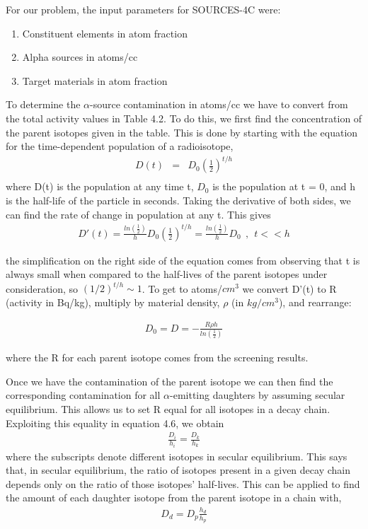 \documentclass{report}
\begin{document}
For our problem, the input parameters for SOURCES-4C were:
\begin{enumerate}
\item Constituent elements in atom fraction
\item Alpha sources in atoms/cc
\item Target materials in atom fraction
\end{enumerate}

To determine the $\alpha$-source contamination in atoms/cc we have to convert
from the total activity values in Table 4.2. To do this, we first find the concentration of the parent isotopes given in the table. This is done by starting with the equation for the time-dependent population of a radioisotope,
\begin{eqnarray}
D(t) & =& D_0\left(\frac{1}{2}\right)^{t/h} \\
\end{eqnarray}
where D(t) is the population at any time t, $D_0$ is the population at t = 0, and h is the half-life of the particle in seconds. Taking the derivative of both sides, we can find the rate of change in population at any t. This gives
\begin{eqnarray}
D'(t) = \frac{ln\left(\frac{1}{2}\right)}{h}D_0\left(\frac{1}{2}\right)^{t/h} = \frac{ln\left(\frac{1}{2}\right)}{h}D_0 \ \ , \ \ t << h
\end{eqnarray}

the simplification on the right side of the equation comes from observing that t is always small when compared to the half-lives of the parent isotopes under consideration, so $(1/2)^{t/h} \sim 1$. To get to atoms/$cm^3$ we convert D'(t) to R (activity in Bq/kg), multiply by material density, $\rho$ (in $kg/cm^3$), and rearrange:

\begin{eqnarray}
D_0 = D = -\frac{R \rho h}{ln\left(\frac{1}{2}\right)}
\end{eqnarray}

where the R for each parent isotope comes from the screening results.

Once we have the contamination of the parent isotope we can then find the
corresponding contamination for all $\alpha$-emitting daughters by assuming secular equilibrium. This allows us to set R equal for all isotopes in a decay chain. Exploiting this equality in equation 4.6, we obtain
\begin{eqnarray}
\frac{D_i}{h_i} = \frac{D_k}{h_k}
\end{eqnarray}
where the subscripts denote different isotopes in secular equilibrium. This says that, in secular equilibrium, the ratio of isotopes present in a given decay chain depends only on the ratio of those isotopes' half-lives. This can be applied to find the amount of each daughter isotope from the parent isotope in a chain with,
\begin{eqnarray}
D_{d} = D_{p}\frac{h_{d}}{h_{p}}
\end{eqnarray}
\end{document}
